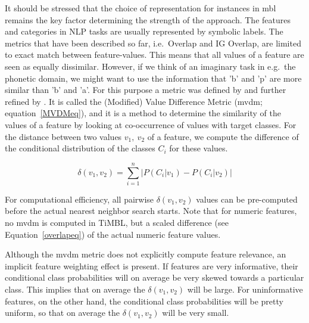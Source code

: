 \documentclass{report}
\begin{document}
It should be stressed that the choice of representation for instances
in {\sc mbl} remains the key factor determining the strength of the
approach. The features and categories in NLP tasks are usually
represented by symbolic labels. The metrics that have been described
so far, i.e.~Overlap and IG Overlap, are limited to exact match
between feature-values. This means that all values of a feature are
seen as equally dissimilar. However, if we think of an imaginary task
in e.g.~the phonetic domain, we might want to use the information that
'b' and 'p' are more similar than 'b' and 'a'. For this purpose a
metric was defined by  and further refined by
. It is called the (Modified) Value Difference
Metric ({\sc mvdm}; equation~\ref{MVDMeq}), and it is a method to
determine the similarity of the values of a feature by looking at
co-occurrence of values with target classes. For the distance between
two values $v_{1},\ v_{2}$ of a feature, we compute the difference of
the conditional distribution of the classes $C_{i}$ for these values.

\begin{equation}
\delta(v_{1}, v_{2}) = \sum_{i=1}^{n} \left| P(C_{i}|v_{1}) - P(C_{i}|v_{2})
\right|
\label{MVDMeq}
\end{equation}

For computational efficiency, all pairwise $\delta(v_{1}, v_{2})$
values can be pre-comput\-ed before the actual nearest neighbor search
starts. Note that for numeric features, no {\sc mvdm} is computed in
TiMBL, but a scaled difference (see Equation~\ref{overlapeq}) of the
actual numeric feature values.

Although the {\sc mvdm} metric does not explicitly compute feature
relevance, an implicit feature weighting effect is present. If
features are very informative, their conditional class probabilities
will on average be very skewed towards a particular class. This
implies that on average the $\delta(v_{1}, v_{2})$ will be large. For
uninformative features, on the other hand, the conditional class
probabilities will be pretty uniform, so that on average the
$\delta(v_{1}, v_{2})$ will be very small.
\end{document}
